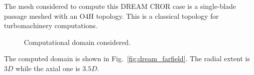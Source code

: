 
The mesh considered to compute this
DREAM CROR case is a single-blade passage meshed
with an O4H topology. This is a classical
topology for turbomachinery computations.
\begin{figure}[htb]
  \centering
  \caption{Computational domain considered.}
\end{figure}
The computed domain is shown in Fig.~\ref{fig:dream_farfield}.
The radial extent is $3D$ while the axial one is $3.5D$.